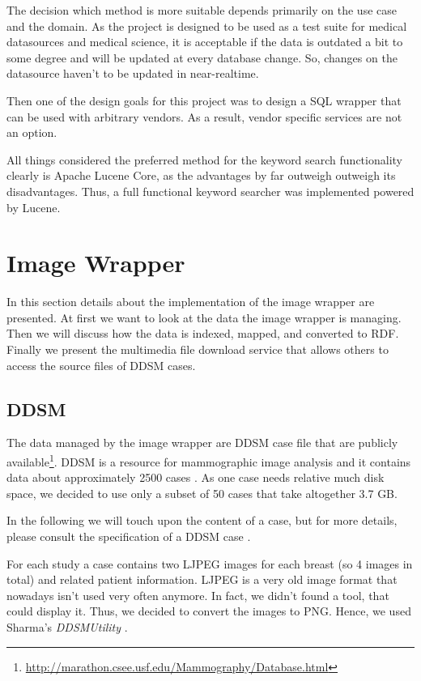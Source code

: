 The decision which method is more suitable depends primarily on the use case and the domain. As the project is designed to be used as a test suite for medical datasources and medical science, it is acceptable if the data is outdated a bit to some degree and will be updated at every database change. So, changes on the datasource haven't to be updated in near-realtime.

Then one of the design goals for this project was to design a SQL wrapper that can be used with arbitrary vendors. As a result, vendor specific services are not an option.

All things considered the preferred method for the keyword search functionality clearly is Apache Lucene Core, as the advantages by far outweigh outweigh its disadvantages. Thus, a full functional keyword searcher was implemented powered by Lucene.


\section{Image Wrapper}
 
In this section details about the implementation of the image wrapper are presented. 
At first we want to look at the data the image wrapper is managing. Then we will discuss how the data is indexed, mapped, and converted to RDF. Finally we present the multimedia file download service that allows others to access the source files of DDSM cases.

\subsection{DDSM}

The data managed by the image wrapper are DDSM case file that are publicly available\footnote{\url{http://marathon.csee.usf.edu/Mammography/Database.html}}.
DDSM is a resource for mammographic image analysis and it contains data about approximately 2500 cases \cite{DDSM}. As one case needs relative much disk space, we decided to use only a subset of 50 cases that take altogether 3.7 GB.

In the following we will touch upon the content of a case, but for more details, please consult the specification of a DDSM case \cite{DDSM_CASE_SPEC}. 

For each study a case contains two LJPEG images for each breast (so 4 images in total) and related patient information. LJPEG is a very old image format that nowadays isn’t used very often anymore. In fact, we didn't found a tool, that could display it. Thus, we decided to convert the images to PNG. Hence, we used Sharma's \emph{DDSMUtility} \cite{DDSM_UTILITY}.

